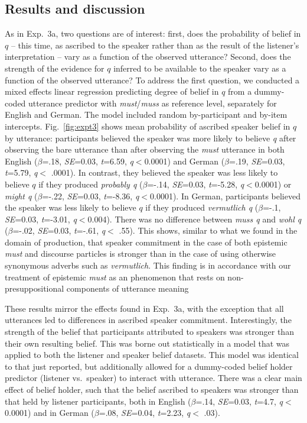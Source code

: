 \documentclass[11pt]{article}
\begin{document}
\subsection{Results and discussion}

As in Exp.~3a, two questions are of interest: first, does the probability of  belief in $q$ -- this time, as ascribed to the speaker rather than as the result of the listener's interpretation --  vary as a function of the observed utterance? Second, does the strength of the evidence for $q$ inferred to be available to the speaker vary as a function of the observed utterance? To address the first question, we conducted a mixed effects linear regression predicting degree of belief in $q$ from a dummy-coded utterance predictor with \emph{must}/\emph{muss} as reference level, separately for English and German. The model included random by-participant and by-item intercepts. Fig.~\ref{fig:expt3} shows mean probability of ascribed speaker belief in $q$ by utterance: participants believed the speaker was more likely to believe \emph{q}  after observing the bare utterance than after observing the \emph{must} utterance in both English   ($\beta$=.18, \emph{SE}=0.03, \emph{t}=6.59, \emph{q}$<$0.0001) and German ($\beta$=.19, \emph{SE}=0.03, \emph{t}=5.79, \emph{q}$<$ .0001). In contrast, they believed the speaker was less likely to believe $q$ if they produced \emph{probably q} ($\beta$=-.14, \emph{SE}=0.03, \emph{t}=-5.28, \emph{q}$<$0.0001) or \emph{might q} ($\beta$=-.22, \emph{SE}=0.03, \emph{t}=-8.36, \emph{q}$<$0.0001). In German, participants believed the speaker was less likely to believe $q$ if they produced \emph{vermutlich q} ($\beta$=-.1, \emph{SE}=0.03, \emph{t}=-3.01, \emph{q}$<$0.004). There was no difference between \emph{muss q} and \emph{wohl q} ($\beta$=-.02, \emph{SE}=0.03, \emph{t}=-.61, \emph{q}$<$ .55).  This shows, similar to what we found in the domain of production, that speaker commitment in the case of both epistemic \emph{must} and discourse particles is stronger than in the case of using otherwise synonymous adverbs such as \emph{vermutlich}. This finding is in accordance with our treatment of epistemic \emph{must} as an phenomenon that rests on non-presuppositional components of utterance meaning

These results mirror the effects found in Exp.~3a, with the exception that all utterances led to differences in ascribed speaker commitment. Interestingly, the strength of the belief that participants attributed to speakers was stronger than their own resulting belief. This was borne out statistically in a model that was applied to both the listener and speaker belief datasets. This model was identical to that just reported, but additionally allowed for a dummy-coded belief holder predictor (listener vs.~speaker)  to interact with utterance. There was a clear main effect of belief holder, such that the belief ascribed to speakers was stronger than that held by listener participants, both in English ($\beta$=.14, \emph{SE}=0.03, \emph{t}=4.7, \emph{q}$<$0.0001) and in German ($\beta$=.08, \emph{SE}=0.04, \emph{t}=2.23, \emph{q}$<$ .03). 
\end{document}
